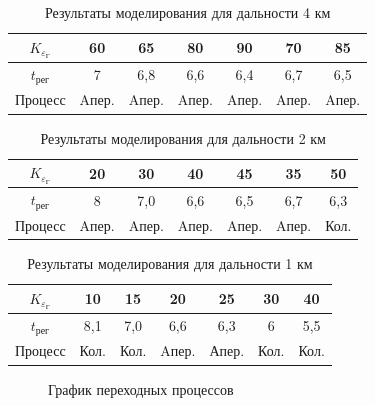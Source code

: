 \begin{table}[H]
    \centering
    \caption{Результаты моделирования для дальности 4 км}
    \begin{tabular}{c|c|c|c|c|c|c}
    \hline
        $K_{\varepsilon_\text{Г}}$& 60 & 65 & 80 & \cellcolor{cyan}90 & 70 & 85  \\ \hline
        $t_\text{рег}$ & 7 & 6,8 & 6,6 &\cellcolor{cyan} 6,4 & 6,7 & 6,5  \\ \hline
        Процесс& Aпер. & Aпер. & Aпер. &\cellcolor{cyan} Aпер. & Aпер. &Aпер.\\ \hline
    \end{tabular}
    \label{tab:10KM}
\end{table}

\begin{table}[H]
    \centering
    \caption{Результаты моделирования для дальности 2 км}
    \begin{tabular}{c|c|c|c|c|c|c}
    \hline
        $K_{\varepsilon_\text{Г}}$& 20 & 30 & 40 & \cellcolor{cyan}45 & 35 & 50  \\ \hline
        $t_\text{рег}$ & 8 & 7,0 & 6,6 & \cellcolor{cyan}6,5 & 6,7 & 6,3  \\ \hline
        Процесс& Aпер. & Aпер. & Aпер. &\cellcolor{cyan} Aпер. & Aпер. &Кол.\\ \hline
    \end{tabular}
    \label{tab:10KM}
\end{table}

\begin{table}[H]
    \centering
    \caption{Результаты моделирования для дальности 1 км}
    \begin{tabular}{c|c|c|c|c|c|c}
    \hline
        $K_{\varepsilon_\text{Г}}$& 10 & 15 & 20 & \cellcolor{cyan}25 & 30 & 40  \\ \hline
        $t_\text{рег}$ & 8,1 & 7,0 & 6,6 &\cellcolor{cyan} 6,3 & 6 & 5,5  \\ \hline
        Процесс& Кол. & Кол. & Aпер. &\cellcolor{cyan} Апер. & Кол. &Кол.\\ \hline
    \end{tabular}
    \label{tab:10KM}
\end{table}

\begin{figure}[H]
    \centering
    \caption{График переходных процессов}
    \label{fig:steps2}
\end{figure}

